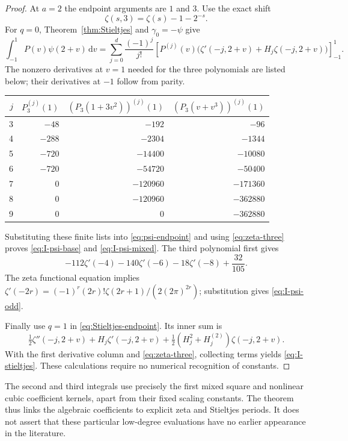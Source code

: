 \documentclass[11pt]{article}
\numberwithin{equation}{section}
\theoremstyle{definition}\newtheorem{definition}[theorem]{Definition}
\theoremstyle{remark}\newtheorem{remark}[theorem]{Remark}
\newcommand{\dd}{\,\mathrm d}
\newcommand{\eval}[1]{\left[#1\right]_{-1}^{1}}
\begin{document}
\begin{proof}
At $a=2$ the endpoint arguments are $1$ and $3$. Use the exact shift
\begin{equation}\label{eq:zeta-three}
 \zeta(s,3)=\zeta(s)-1-2^{-s}.
\end{equation}
For $q=0$, Theorem~\ref{thm:Stieltjes} and $\gamma_0=-\psi$ give
\begin{equation}\label{eq:psi-endpoint}
 \int_{-1}^1P(v)\psi(2+v)\dd v
 =\sum_{j=0}^d\frac{(-1)^j}{j!}
 \eval{P^{(j)}(v)\bigl(\zeta'(-j,2+v)+H_j\zeta(-j,2+v)\bigr)}.
\end{equation}
The nonzero derivatives at $v=1$ needed for the three polynomials are
listed below; their derivatives at $-1$ follow from parity.
\begin{center}\small
\begin{tabular}{r|rrr}
\toprule
$j$ & $P_3^{(j)}(1)$ & $(P_3(1+3v^2))^{(j)}(1)$
    & $(P_3(v+v^3))^{(j)}(1)$\\
\midrule
3 & $-48$ & $-192$ & $-96$\\
4 & $-288$ & $-2304$ & $-1344$\\
5 & $-720$ & $-14400$ & $-10080$\\
6 & $-720$ & $-54720$ & $-50400$\\
7 & $0$ & $-120960$ & $-171360$\\
8 & $0$ & $-120960$ & $-362880$\\
9 & $0$ & $0$ & $-362880$\\
\bottomrule
\end{tabular}
\end{center}
Substituting these finite lists into \eqref{eq:psi-endpoint} and using
\eqref{eq:zeta-three} proves \eqref{eq:I-psi-base} and
\eqref{eq:I-psi-mixed}. The third polynomial first gives
\[
 -112\zeta'(-4)-140\zeta'(-6)-18\zeta'(-8)+\frac{32}{105}.
\]
The zeta functional equation implies
$\zeta'(-2r)=(-1)^r(2r)!\zeta(2r+1)/(2(2\pi)^{2r})$;
substitution gives \eqref{eq:I-psi-odd}.

Finally use $q=1$ in \eqref{eq:Stieltjes-endpoint}. Its inner sum is
\[
 \tfrac12\zeta''(-j,2+v)+H_j\zeta'(-j,2+v)
 +\tfrac12(H_j^2+H_j^{(2)})\zeta(-j,2+v).
\]
With the first derivative column and \eqref{eq:zeta-three}, collecting
terms yields \eqref{eq:I-stieltjes}. These calculations require no
numerical recognition of constants.
\end{proof}

The second and third integrals use precisely the first mixed square and
nonlinear cubic coefficient kernels, apart from their fixed scaling
constants. The theorem thus links the algebraic coefficients to explicit
zeta and Stieltjes periods. It does not assert that these particular
low-degree evaluations have no earlier appearance in the literature.
\end{document}
